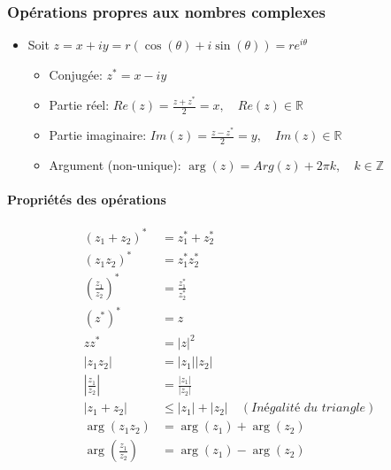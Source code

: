 \subsubsection*{Opérations propres aux nombres complexes}
\begin{itemize}
    \item[] Soit $z = x + iy = r(\cos(\theta)+i\sin(\theta)) = re^{i\theta}$
    \begin{itemize}[itemsep = 0.5em]
        \item[] Conjugée: $z^{*} = x - iy$
        \item[] Partie réel: $Re(z) = \frac{z + z^{*}}{2} = x, \quad Re(z) \in \mathbb{R}$
        \item[] Partie imaginaire: $Im(z) = \frac{z - z^{*}}{2} = y, \quad Im(z) \in \mathbb{R}$
        \item[] Argument (non-unique): $\arg(z) = Arg(z) + 2\pi k, \quad k \in \mathbb{Z}$
      \end{itemize}
\end{itemize}


\paragraph*{Propriétés des opérations}
\begingroup
\addtolength{\jot}{0.5em}
\begin{align*}
    \left(z_1 + z_2\right)^* &= z_1^* + z_2^* \\
    \left(z_1z_2\right)^* &= z_1^{*} z_2^* \\
    \left( \frac{z_1}{z_2}\right)^{*} &= \frac{z_1^*}{z_2^*} \\
    \left(z^*\right)^* &= z \\
    zz^{*} &= |z|^2 \\
    |z_1z_2| &= |z_1||z_2|\\
    \left| \frac{z_1}{z_2} \right| &= \frac{|z_1|}{|z_2|} \\
    \left|z_1 + z_2\right| &\leq |z_1| + |z_2| \quad (\textit{Inégalité du triangle}) \\
    \arg(z_1z_2) &= \arg(z_1) + \arg(z_2) \\
    \arg\left( \frac{z_1}{z_2}\right) &= \arg(z_1) - \arg(z_2)
\end{align*}
\endgroup


